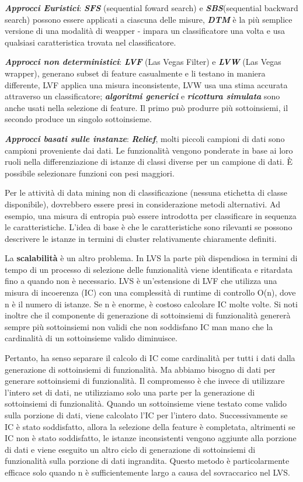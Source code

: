 \documentclass[a4paper]{extarticle}
\begin{document}
\textbf{\textit{Approcci Euristici}}: \textbf{\textit{SFS}} (sequential foward search) e \textbf{\textit{SBS}}(sequential backward search) possono essere applicati a ciascuna delle misure, \textbf{\textit{DTM}} è la più semplice versione  di una modalità di weapper - impara un classificatore una volta e usa qualsiasi caratteristica trovata nel classificatore. 

\textbf{\textit{Approcci non deterministici}}: \textbf{\textit{LVF}} (Las Vegas Filter) e \textbf{\textit{LVW}} (Las Vegas wrapper), generano subset di feature casualmente e li testano in maniera differente, LVF applica una misura inconsistente, LVW usa una stima accurata attraverso un classificatore; \textbf{\textit{algoritmi generici}} e \textbf{\textit{ricottura simulata}} sono anche usati nella selezione di feature. Il primo può produrre più sottoinsiemi, il secondo produce un singolo sottoinsieme.

\textbf{\textit{Approcci basati sulle instanze}}: \textbf{\textit{Relief}}, molti piccoli campioni di dati sono campioni proveniente dai dati. Le funzionalità vengono ponderate in base ai loro ruoli nella differenziazione di istanze di classi diverse per un campione di dati. È possibile selezionare funzioni con pesi maggiori. 

Per le attività di data mining non di classificazione (nessuna etichetta di classe disponibile), dovrebbero essere presi in considerazione metodi alternativi. Ad esempio, una misura di entropia può essere introdotta per classificare in sequenza le caratteristiche. L'idea di base è che le caratteristiche sono rilevanti se possono descrivere le istanze in termini di cluster relativamente chiaramente definiti.

La \textbf{scalabilità} è un altro problema. In LVS la parte più dispendiosa in termini di tempo di un processo di selezione delle funzionalità viene identificata e ritardata fino a quando non è necessario. LVS è un'estensione di LVF che utilizza una misura di incoerenza (IC) con una complessità di runtime di controllo O(n), dove n è il numero di istanze. Se n è enorme, è costoso calcolare IC molte volte. Si noti inoltre che il componente di generazione di sottoinsiemi di funzionalità genererà sempre più sottoinsiemi non validi che non soddisfano IC man mano che la cardinalità di un sottoinsieme valido diminuisce. 

Pertanto, ha senso separare il calcolo di IC come cardinalità per tutti i dati dalla generazione di sottoinsiemi di funzionalità. Ma abbiamo bisogno di dati per generare sottoinsiemi di funzionalità. Il compromesso è che invece di utilizzare l'intero set di dati, ne utilizziamo solo una parte per la generazione di sottoinsiemi di funzionalità. Quando un sottoinsieme viene testato come valido sulla porzione di dati, viene calcolato l'IC per l'intero dato. Successivamente se IC è stato soddisfatto, allora la selezione della feature è completata, altrimenti se IC non è stato soddisfatto, le istanze inconsistenti vengono aggiunte alla porzione di dati e viene eseguito un altro ciclo di generazione di sottoinsiemi di funzionalità sulla porzione di dati ingrandita. Questo metodo è particolarmente efficace solo quando n è sufficientemente largo a causa del sovraccarico nel LVS.
\end{document}
